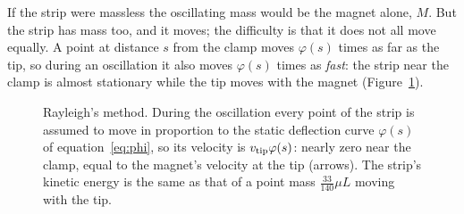 \documentclass[11pt,a4paper]{article}
\begin{document}
If the strip were massless the oscillating mass would be the magnet alone, $M$. But the strip has mass too, and it moves; the difficulty is that it does not all move equally. A point at distance $s$ from the clamp moves $\varphi(s)$ times as far as the tip, so during an oscillation it also moves $\varphi(s)$ times as \emph{fast}: the strip near the clamp is almost stationary while the tip moves with the magnet (Figure~\ref{fig:rayleigh}).

\begin{figure}[htbp]
\centering
{}
\caption{Rayleigh's method. During the oscillation every point of the strip is assumed to move in proportion to the static deflection curve $\varphi(s)$ of equation~\eqref{eq:phi}, so its velocity is $v_{\rm tip}\varphi(s)$: nearly zero near the clamp, equal to the magnet's velocity at the tip (arrows). The strip's kinetic energy is the same as that of a point mass $\tfrac{33}{140}\mu L$ moving with the tip.}
\label{fig:rayleigh}
\end{figure}
\end{document}
